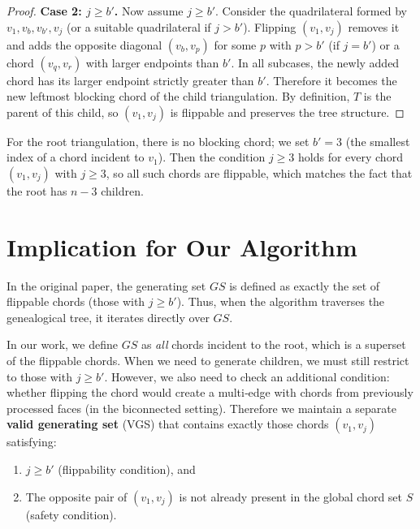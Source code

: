 \begin{proof}
    \noindent\textbf{Case 2: \(j \ge b'\).} 
    Now assume \(j \ge b'\). 
    Consider the quadrilateral formed by \(v_1, v_{b}, v_{b'}, v_j\) (or a suitable quadrilateral if \(j > b'\)). 
    Flipping \((v_1, v_j)\) removes it and adds the opposite diagonal \((v_{b}, v_{p})\) for some \(p\) with \(p > b'\) (if \(j = b'\)) or a chord \((v_{q}, v_{r})\) with larger endpoints than \(b'\). 
    In all subcases, the newly added chord has its larger endpoint strictly greater than \(b'\). 
    Therefore it becomes the new leftmost blocking chord of the child triangulation. 
    By definition, \(T\) is the parent of this child, so \((v_1, v_j)\) is flippable and preserves the tree structure.
\end{proof}

\begin{remark}
    For the root triangulation, there is no blocking chord; we set \(b' = 3\) (the smallest index of a chord incident to \(v_1\)). 
    Then the condition \(j \ge 3\) holds for every chord \((v_1, v_j)\) with \(j \ge 3\), so all such chords are flippable, which matches the fact that the root has \(n-3\) children.
\end{remark}

\section{Implication for Our Algorithm}
\label{sec:implication}

In the original paper, the generating set \(GS\) is defined as exactly the set of flippable chords (those with \(j \ge b'\)). 
Thus, when the algorithm traverses the genealogical tree, it iterates directly over \(GS\).

In our work, we define \(GS\) as \emph{all} chords incident to the root, which is a superset of the flippable chords. 
When we need to generate children, we must still restrict to those with \(j \ge b'\). 
However, we also need to check an additional condition: whether flipping the chord would create a multi‑edge with chords from previously processed faces (in the biconnected setting). 
Therefore we maintain a separate \textbf{valid generating set} (VGS) that contains exactly those chords \((v_1, v_j)\) satisfying:

\begin{enumerate}
    \item \(j \ge b'\) (flippability condition), and
    \item The opposite pair of \((v_1, v_j)\) is not already present in the global chord set \(S\) (safety condition).
\end{enumerate}

